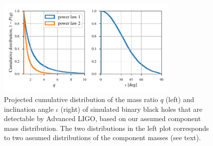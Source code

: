 \documentclass[prl,preprintnumbers,twocolumn,eqsecnum,floatfix,a4paper,nofootinbib,superscriptaddress]{revtex4}
\newcommand{\red}[1]{\textcolor{red}{#1}}
\begin{document}
% 


\begin{figure}[tbh]
	\includegraphics*[width=3.5in]{figs/q_and_iota_dist.pdf}
	\caption{Projected cumulative distribution of the mass ratio $q$ (left) and inclination angle $\iota$ (right) of simulated binary black holes that are detectable by Advanced LIGO, based on our assumed component mass distribution. The two distributions in the left plot corresponds to two assumed distributions of the component masses (see text).}
	\label{fig:q_iota_distribution}
\end{figure}
\end{document}
